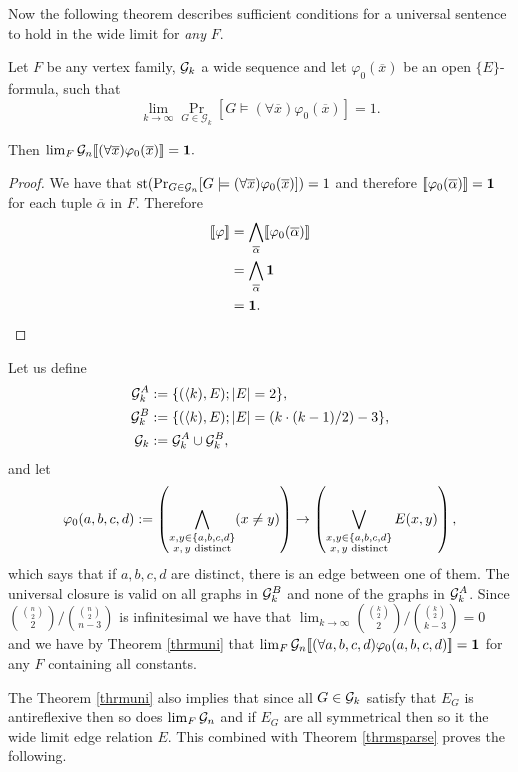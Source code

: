 Now the following theorem describes sufficient conditions for a universal sentence to hold in the wide limit for \textit{any} $F$.

\begin{thrm}\label{thrmuni}
Let $F$ be any vertex family, $\mathcal{G}_k$ a wide sequence and let $\varphi_0(\overline x)$ be an open $\{E\}$-formula, such that
\[\lim_{k\to\infty}\Pr_{G\in\mathcal{G}_k}[G\models(\forall \overline x)\varphi_0(\overline x)]=1.\]

Then $\lim_F \mathcal{G}_n [\![(\forall \overline x)\varphi_0(\overline x)]\!]=\textbf{1}.$


\end{thrm}

\begin{proof}
We have that $\text{st}(\Pr_{G\in\mathcal{G}_n}[G\models(\forall \overline x)\varphi_0(\overline x)])=1$ and therefore $[\![\varphi_0(\overline\alpha)]\!]=\textbf{1}$ for each tuple $\overline\alpha$ in $F$. Therefore
\begin{align}
[\![\varphi]\!]&=\bigwedge_{\overline\alpha}[\![\varphi_0(\overline\alpha)]\!]\\
&=\bigwedge_{\overline\alpha}\textbf{1}\\
&=\textbf{1}.
\end{align}
\end{proof}

\begin{exam}
Let us define
\begin{align}
\mathcal{G}_k^{A}&:=\{(\langle k),E);\left|{E}\right|=2\},\\
\mathcal{G}_k^{B}&:=\{(\langle k),E);\left|{E}\right|=(k\cdot(k-1)/2)-3\},\\
\mathcal{G}_k&:=\mathcal{G}_k^{A}\cup\mathcal{G}_k^{B},
\end{align}
and let 
\[\varphi_0(a,b,c,d):=\left(\bigwedge_{\substack{x, y\in\{a,b,c,d\}\\\text{$x,y$ distinct}}}(x\not=y)\right)\to\left(\bigvee_{\substack{x, y\in\{a,b,c,d\}\\\text{$x,y$ distinct}}}E(x,y)\right),\]
which says that if $a,b,c,d$ are distinct, there is an edge between one of them. The universal closure is valid on all graphs in $\mathcal{G}_k^B$ and none of the graphs in $\mathcal{G}_k^A$. Since $\binom{\binom{n}{2}}{2}/\binom{\binom{n}{2}}{n-3}$ is infinitesimal we have that $\lim_{k\to\infty} \binom{\binom{k}{2}}{2}/\binom{\binom{k}{2}}{k-3}=0$ and we have by Theorem \ref{thrmuni} that $\lim_F \mathcal{G}_n [\![(\forall a,b,c,d)\varphi_0(a,b,c,d)]\!]=\textbf{1}$ for any $F$ containing all constants.
\end{exam}

The Theorem \ref{thrmuni} also implies that since all $G\in\mathcal{G}_k$ satisfy that $E_G$ is antireflexive then so does $\lim_{F}\mathcal{G}_n$ and if $E_G$ are all symmetrical then so it the wide limit edge relation $E$. This combined with Theorem \ref{thrmsparse} proves the following.

